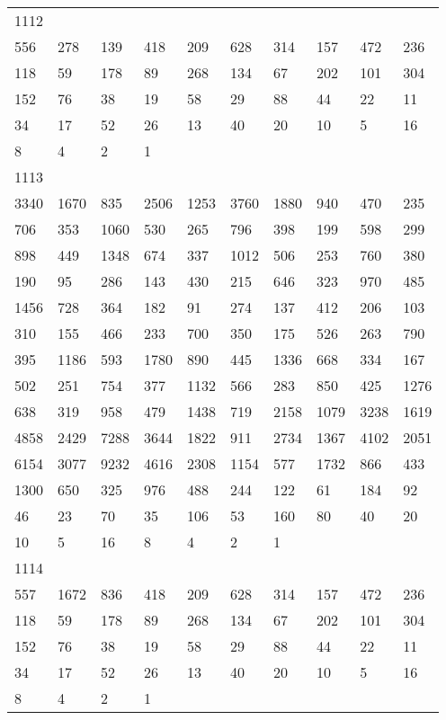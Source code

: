 \begin{longtable}{*{10}{l}}
1112&&&&&&&&&\\
556& 278& 139& 418& 209& 628& 314& 157& 472& 236\\
118& 59& 178& 89& 268& 134& 67& 202& 101& 304\\
152& 76& 38& 19& 58& 29& 88& 44& 22& 11\\
34& 17& 52& 26& 13& 40& 20& 10& 5& 16\\
8& 4& 2& 1& \\

1113&&&&&&&&&\\
3340& 1670& 835& 2506& 1253& 3760& 1880& 940& 470& 235\\
706& 353& 1060& 530& 265& 796& 398& 199& 598& 299\\
898& 449& 1348& 674& 337& 1012& 506& 253& 760& 380\\
190& 95& 286& 143& 430& 215& 646& 323& 970& 485\\
1456& 728& 364& 182& 91& 274& 137& 412& 206& 103\\
310& 155& 466& 233& 700& 350& 175& 526& 263& 790\\
395& 1186& 593& 1780& 890& 445& 1336& 668& 334& 167\\
502& 251& 754& 377& 1132& 566& 283& 850& 425& 1276\\
638& 319& 958& 479& 1438& 719& 2158& 1079& 3238& 1619\\
4858& 2429& 7288& 3644& 1822& 911& 2734& 1367& 4102& 2051\\
6154& 3077& 9232& 4616& 2308& 1154& 577& 1732& 866& 433\\
1300& 650& 325& 976& 488& 244& 122& 61& 184& 92\\
46& 23& 70& 35& 106& 53& 160& 80& 40& 20\\
10& 5& 16& 8& 4& 2& 1& \\

1114&&&&&&&&&\\
557& 1672& 836& 418& 209& 628& 314& 157& 472& 236\\
118& 59& 178& 89& 268& 134& 67& 202& 101& 304\\
152& 76& 38& 19& 58& 29& 88& 44& 22& 11\\
34& 17& 52& 26& 13& 40& 20& 10& 5& 16\\
8& 4& 2& 1& \\


\end{longtable}
